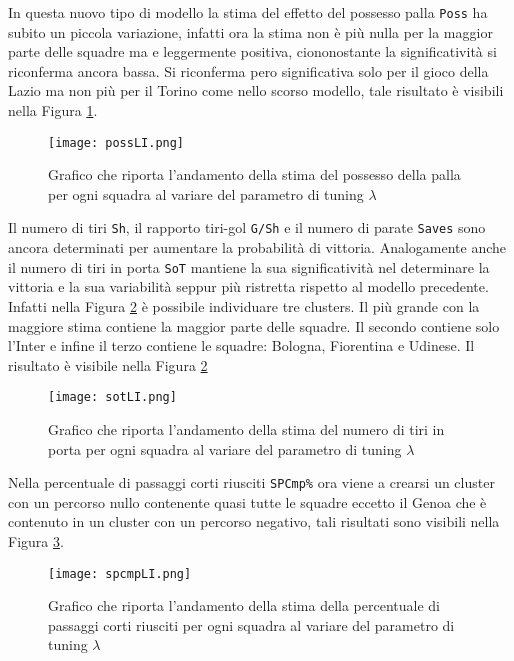 In questa nuovo tipo di modello la stima del effetto del possesso palla \texttt{Poss} ha subito un piccola variazione, infatti ora la stima non è più nulla per la maggior parte delle squadre ma e leggermente positiva, ciononostante la significatività si riconferma ancora bassa. Si riconferma pero significativa solo per il gioco della Lazio ma non più per il Torino come nello scorso modello, tale risultato è visibili nella Figura \ref{fig:possLI}.\\
\begin{figure}[]
	\begin{center}
		\texttt{[image: possLI.png]}
		\caption{Grafico che riporta l'andamento della stima del possesso della palla per ogni squadra al variare del parametro di tuning $\lambda$} \label{fig:possLI}
	\end{center}
\end{figure}
Il numero di tiri \texttt{Sh}, il rapporto tiri-gol \texttt{G/Sh} e il numero di parate \texttt{Saves} sono ancora determinati per aumentare la probabilità di vittoria. Analogamente anche il numero di tiri in porta \texttt{SoT} mantiene la sua significatività nel determinare la vittoria e la sua variabilità seppur più ristretta rispetto al modello precedente. Infatti nella Figura \ref{fig:sotLI} è possibile individuare tre clusters. Il più grande con la maggiore stima contiene la maggior parte delle squadre. Il secondo contiene solo l'Inter e infine il terzo contiene le squadre: Bologna, Fiorentina e Udinese. Il risultato è visibile nella Figura \ref{fig:sotLI} \\
\begin{figure}[htbp]
	\begin{center}
		\texttt{[image: sotLI.png]}
		\caption{Grafico che riporta l'andamento della stima del numero di tiri in porta per ogni squadra al variare del parametro di tuning $\lambda$} \label{fig:sotLI}
	\end{center}
\end{figure}
Nella percentuale di passaggi corti riusciti \texttt{SPCmp\%} ora viene a crearsi un cluster con un percorso nullo contenente quasi tutte le squadre eccetto il Genoa che è contenuto in un cluster con un percorso negativo, tali risultati sono visibili nella Figura \ref{fig:spcmpLI}.\\
\begin{figure}[htbp]
	\begin{center}
		\texttt{[image: spcmpLI.png]}
		\caption{Grafico che riporta l'andamento della stima della percentuale di passaggi corti riusciti per ogni squadra al variare del parametro di tuning $\lambda$} \label{fig:spcmpLI}
	\end{center}
\end{figure}
